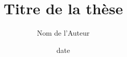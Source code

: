 \documentclass{these}
\title{Titre de la thèse}
\author{Nom de l'Auteur}
\date{date}
\begin{document}
\frontmatter
\maketitle


%
\tableofcontents

\mainmatter




\makeback


\backmatter
\end{document}

